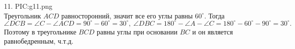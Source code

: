 11. {{PIC:g11.png}}\\
Треугольник $ACD$ равносторонний, значит все его углы равны $60^\circ.$ Тогда $\angle DCB=\angle C-\angle ACD=90^\circ-60^\circ=30^\circ,\ \angle DBC=180^\circ-\angle A-\angle C=180^\circ-60^\circ-90^\circ=30^\circ.$ Поэтому в треугольнике $BCD$ равны углы при основании $BC$ и он является равнобедренным, ч.т.д.\\
